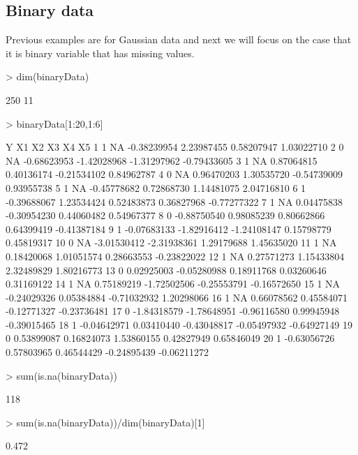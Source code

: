 \documentclass[a4paper]{article}
\begin{document}
\subsection{Binary data}
Previous examples are for Gaussian data and next we will focus on the case that it is binary variable that has missing values. 
\begin{Schunk}
\begin{Sinput}
> dim(binaryData)
\end{Sinput}
\begin{Soutput}
[1] 250  11
\end{Soutput}
\begin{Sinput}
> binaryData[1:20,1:6]
\end{Sinput}
\begin{Soutput}
   Y          X1          X2          X3          X4          X5
1  1          NA -0.38239954  2.23987455  0.58207947  1.03022710
2  0          NA -0.68623953 -1.42028968 -1.31297962 -0.79433605
3  1          NA  0.87064815  0.40136174 -0.21534102  0.84962787
4  0          NA  0.96470203  1.30535720 -0.54739009  0.93955738
5  1          NA -0.45778682  0.72868730  1.14481075  2.04716810
6  1 -0.39688067  1.23534424  0.52483873  0.36827968 -0.77277322
7  1          NA  0.04475838 -0.30954230  0.44060482  0.54967377
8  0 -0.88750540  0.98085239  0.80662866  0.64399419 -0.41387184
9  1 -0.07683133 -1.82916412 -1.24108147  0.15798779  0.45819317
10 0          NA -3.01530412 -2.31938361  1.29179688  1.45635020
11 1          NA  0.18420068  1.01051574  0.28663553 -0.23822022
12 1          NA  0.27571273  1.15433804  2.32489829  1.80216773
13 0  0.02925003 -0.05280988  0.18911768  0.03260646  0.31169122
14 1          NA  0.75189219 -1.72502506 -0.25553791 -0.16572650
15 1          NA -0.24029326  0.05384884 -0.71032932  1.20298066
16 1          NA  0.66078562  0.45584071 -0.12771327 -0.23736481
17 0 -1.84318579 -1.78648951 -0.96116580  0.99945948 -0.39015465
18 1 -0.04642971  0.03410440 -0.43048817 -0.05497932 -0.64927149
19 0  0.53899087  0.16824073  1.53860155  0.42827949  0.65846049
20 1 -0.63056726  0.57803965  0.46544429 -0.24895439 -0.06211272
\end{Soutput}
\begin{Sinput}
> sum(is.na(binaryData))
\end{Sinput}
\begin{Soutput}
[1] 118
\end{Soutput}
\begin{Sinput}
> sum(is.na(binaryData))/dim(binaryData)[1]
\end{Sinput}
\begin{Soutput}
[1] 0.472
\end{Soutput}
\end{Schunk}
\end{document}
